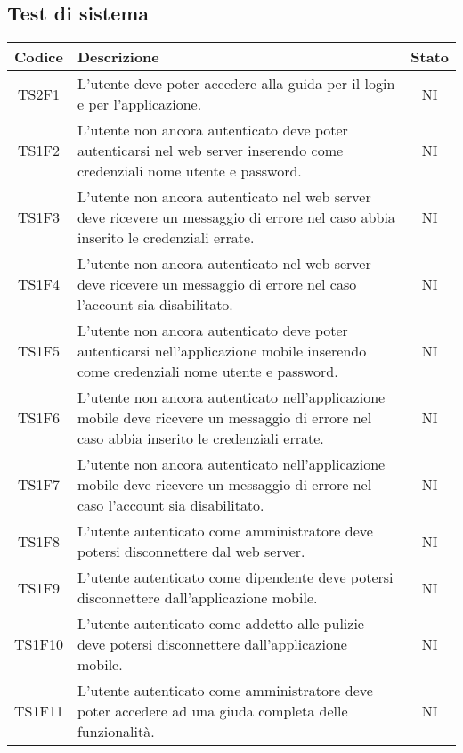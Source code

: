 	\subsection{Test di sistema}
	\begin{center}
		\begin{longtable}{|c|p{10cm}|c|}
			\hline
			\rowcolor{lighter-grayer}
			\textbf{Codice} & \textbf{Descrizione} & \textbf{Stato}  \\ 
						
			\hline
			\endhead
			
			\hline
			TS2F1 & L'utente deve poter accedere alla guida per il login e per l'applicazione. & NI \\
			\hline
			TS1F2 &  L'utente non ancora autenticato deve poter autenticarsi nel web server inserendo come credenziali nome utente e password.  & NI \\			
			\hline
			TS1F3 & L'utente non ancora autenticato nel web server deve ricevere un messaggio di errore nel caso abbia inserito le credenziali errate. & NI \\			
			\hline
			TS1F4 & L'utente non ancora autenticato nel web server deve ricevere un messaggio di errore nel caso l'account sia disabilitato. & NI \\			
			\hline
			TS1F5 & L'utente non ancora autenticato deve poter autenticarsi nell'applicazione mobile inserendo come credenziali nome utente e password. & NI \\			
			\hline
			TS1F6 & L'utente non ancora autenticato nell'applicazione mobile deve ricevere un messaggio di errore nel caso abbia inserito le credenziali errate. & NI \\			
			\hline
			TS1F7 & L'utente non ancora autenticato nell'applicazione mobile deve ricevere un messaggio di errore nel caso l'account sia disabilitato. & NI \\			
			\hline
			TS1F8 & L'utente autenticato come amministratore deve potersi disconnettere dal web server. & NI \\			
			\hline
			TS1F9 & L'utente autenticato come dipendente deve potersi disconnettere dall'applicazione mobile. & NI \\			
			\hline			
			TS1F10 & L'utente autenticato come addetto alle pulizie deve potersi disconnettere dall'applicazione mobile. & NI \\			
			\hline
			TS1F11 & L'utente autenticato come amministratore deve poter accedere ad una giuda completa delle funzionalità. & NI \\		

\end{longtable}
\end{center}
